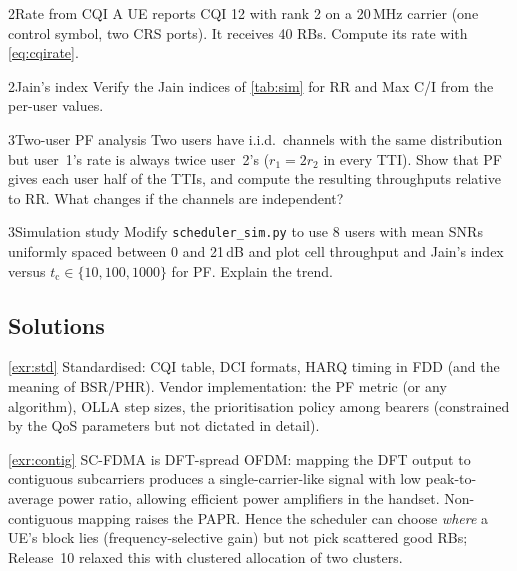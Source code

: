 \documentclass[11pt,a4paper]{article}
\begin{document}
\begin{exercisebox}{2}{Rate from CQI}\label{exr:cqi}
A UE reports CQI 12 with rank 2 on a 20\,MHz carrier (one control symbol, two CRS ports). It receives 40
RBs. Compute its rate with \cref{eq:cqirate}.
\end{exercisebox}

\begin{exercisebox}{2}{Jain's index}\label{exr:jain}
Verify the Jain indices of \cref{tab:sim} for RR and Max C/I from the per-user values.
\end{exercisebox}

\begin{exercisebox}{3}{Two-user PF analysis}\label{exr:pf2}
Two users have i.i.d.\ channels with the same distribution but user~1's rate is always twice user~2's
($r_1 = 2r_2$ in every TTI). Show that PF gives each user half of the TTIs, and compute the resulting
throughputs relative to RR. What changes if the channels are independent?
\end{exercisebox}

\begin{exercisebox}{3}{Simulation study}\label{exr:sim}
Modify \texttt{scheduler\_sim.py} to use 8 users with mean SNRs uniformly spaced between 0 and 21\,dB and
plot cell throughput and Jain's index versus $t_\mathrm{c}\in\{10,100,1000\}$ for PF. Explain the trend.
\end{exercisebox}

\subsection*{Solutions}

\begin{solutionbox}{\ref{exr:std}}
Standardised: CQI table, DCI formats, HARQ timing in FDD (and the meaning of BSR/PHR). Vendor
implementation: the PF metric (or any algorithm), OLLA step sizes, the prioritisation policy among
bearers (constrained by the QoS parameters but not dictated in detail).
\end{solutionbox}

\begin{solutionbox}{\ref{exr:contig}}
SC-FDMA is DFT-spread OFDM: mapping the DFT output to contiguous subcarriers produces a
single-carrier-like signal with low peak-to-average power ratio, allowing efficient power amplifiers
in the handset. Non-contiguous mapping raises the PAPR. Hence the scheduler can choose \emph{where}
a UE's block lies (frequency-selective gain) but not pick scattered good RBs; Release~10 relaxed this
with clustered allocation of two clusters.
\end{solutionbox}
\end{document}
